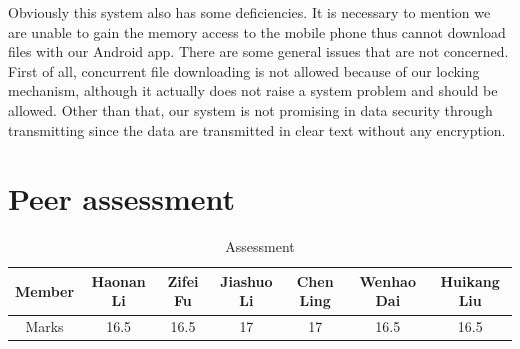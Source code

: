 \documentclass[a4paper,11pt]{article}
\begin{document}
\par Obviously this system also has some deficiencies. It is necessary to mention we are unable to gain the memory access to the mobile phone thus cannot download files with our Android app. There are some general issues that are not concerned. First of all, concurrent file downloading is not allowed because of our locking mechanism, although it actually does not raise a system problem and should be allowed. Other than that, our system is not promising in data security through transmitting since the data are transmitted in clear text without any encryption.
\section{Peer assessment}
\begin{table}[H]
\centering
\begin{tabular}{|c|c|c|c|c|c|c|}
\hline
Member & Haonan Li & Zifei Fu & Jiashuo Li & Chen Ling & Wenhao Dai & Huikang Liu \\
\hline
Marks & 16.5 & 16.5 & 17 & 17 & 16.5 & 16.5\\
\hline
\end{tabular}
\caption{Assessment}
\end{table}
\end{document}

